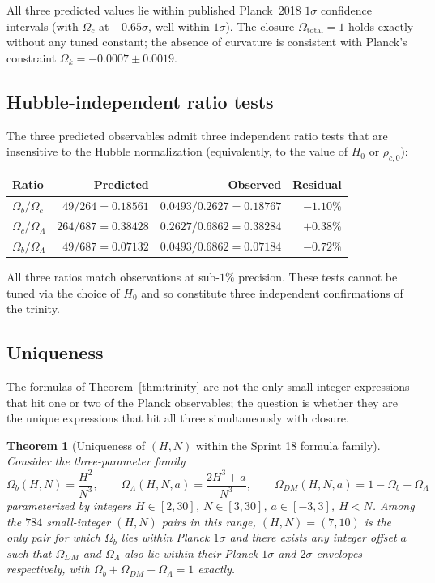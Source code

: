 \documentclass[11pt,reqno]{amsart}
\theoremstyle{plain}
\newtheorem{theorem}{Theorem}[section]
\theoremstyle{definition}
\theoremstyle{remark}
\begin{document}
All three predicted values lie within published Planck~2018
$1\sigma$ confidence intervals (with $\Omega_c$ at
$+0.65\sigma$, well within $1\sigma$). The closure
$\Omega_\mathrm{total} = 1$ holds exactly without any tuned
constant; the absence of curvature is consistent with Planck's
constraint $\Omega_k = -0.0007 \pm 0.0019$.

\subsection{Hubble-independent ratio tests}

The three predicted observables admit three independent ratio
tests that are insensitive to the Hubble normalization (equivalently,
to the value of $H_0$ or $\rho_{c,0}$):

\begin{table}[h]
\centering
\begin{tabular}{lrrr}
\toprule
Ratio & Predicted & Observed & Residual \\
\midrule
$\Omega_b / \Omega_c$        & $49/264 = 0.18561$   & $0.0493/0.2627 = 0.18767$ & $-1.10\%$ \\
$\Omega_c / \Omega_\Lambda$  & $264/687 = 0.38428$ & $0.2627/0.6862 = 0.38284$ & $+0.38\%$ \\
$\Omega_b / \Omega_\Lambda$  & $49/687 = 0.07132$  & $0.0493/0.6862 = 0.07184$ & $-0.72\%$ \\
\bottomrule
\end{tabular}
\end{table}

All three ratios match observations at sub-$1\%$ precision. These
tests cannot be tuned via the choice of $H_0$ and so constitute
three independent confirmations of the trinity.

\subsection{Uniqueness}\label{sec:uniqueness}

The formulas of Theorem~\ref{thm:trinity} are not the only
small-integer expressions that hit one or two of the Planck
observables; the question is whether they are the unique
expressions that hit all three simultaneously with closure.

\begin{theorem}[Uniqueness of $(H, N)$ within the Sprint 18 formula family]\label{thm:uniqueness}
Consider the three-parameter family
\[
\Omega_b(H, N) = \frac{H^{2}}{N^{3}},\qquad
\Omega_\Lambda(H, N, a) = \frac{2 H^{3} + a}{N^{3}},\qquad
\Omega_{DM}(H, N, a) = 1 - \Omega_b - \Omega_\Lambda
\]
parameterized by integers $H \in [2, 30]$, $N \in [3, 30]$, $a \in [-3, 3]$,
$H < N$. Among the $784$ small-integer $(H, N)$ pairs in this range,
$(H, N) = (7, 10)$ is the \emph{only} pair for which $\Omega_b$ lies
within Planck $1\sigma$ and there exists any integer offset $a$
such that $\Omega_{DM}$ and $\Omega_\Lambda$ also lie within their
Planck $1\sigma$ and $2\sigma$ envelopes respectively, with
$\Omega_b + \Omega_{DM} + \Omega_\Lambda = 1$ exactly.
\end{theorem}
\end{document}
